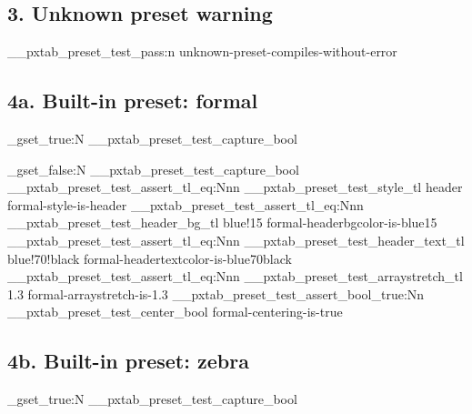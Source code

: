 \documentclass{article}
\begin{document}
\subsection*{3. Unknown preset warning}


\ExplSyntaxOn
\__pxtab_preset_test_pass:n { unknown-preset-compiles-without-error }
\ExplSyntaxOff

\subsection*{4a. Built-in preset: formal}

\ExplSyntaxOn
\bool_gset_true:N \g__pxtab_preset_test_capture_bool
\ExplSyntaxOff


\ExplSyntaxOn
\bool_gset_false:N \g__pxtab_preset_test_capture_bool
\__pxtab_preset_test_assert_tl_eq:Nnn
  \g__pxtab_preset_test_style_tl { header }
  { formal-style-is-header }
\__pxtab_preset_test_assert_tl_eq:Nnn
  \g__pxtab_preset_test_header_bg_tl { blue!15 }
  { formal-headerbgcolor-is-blue15 }
\__pxtab_preset_test_assert_tl_eq:Nnn
  \g__pxtab_preset_test_header_text_tl { blue!70!black }
  { formal-headertextcolor-is-blue70black }
\__pxtab_preset_test_assert_tl_eq:Nnn
  \g__pxtab_preset_test_arraystretch_tl { 1.3 }
  { formal-arraystretch-is-1.3 }
\__pxtab_preset_test_assert_bool_true:Nn
  \g__pxtab_preset_test_center_bool
  { formal-centering-is-true }
\ExplSyntaxOff

\subsection*{4b. Built-in preset: zebra}

\ExplSyntaxOn
\bool_gset_true:N \g__pxtab_preset_test_capture_bool
\ExplSyntaxOff
\end{document}
